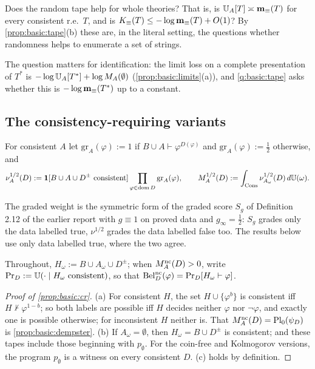 \begin{question}\label{q:basic:tape}
Does the random tape help for whole theories? That is, is $\mathbb{U}_{A}[T]\asymp\mathbf{m}_{\equiv}(T)$ for every consistent r.e.\ $T$, and is $K_{\equiv}(T)\le-\log\mathbf{m}_{\equiv}(T)+O(1)$? By \cref{prop:basic:tape}(b) these are, in the literal setting, the questions whether randomness helps to enumerate a set of strings.
\end{question}

The question matters for identification: the limit loss on a complete presentation of $T^*$ is $-\log\mathbb{U}_{A}[T^*]+\log M_{A}(\emptyset)$ (\cref{prop:basic:limits}(a)), and \cref{q:basic:tape} asks whether this is $-\log\mathbf{m}_{\equiv}(T^*)$ up to a constant.

\subsection{The consistency-requiring variants}\label{app:basic:cr}

\begin{definition}\label{def:setting:graded}
For consistent $A$ let $\mathrm{gr}_A(\varphi):=1$ if $B\cup A\vdash\varphi^{D(\varphi)}$ and $\mathrm{gr}_A(\varphi):=\frac12$ otherwise, and
\[
\nu^{1/2}_A(D):=\mathbf{1}[B\cup A\cup D^\pm\text{ consistent}]\prod_{\varphi\in\operatorname{dom} D}\mathrm{gr}_A(\varphi),\qquad M_{A}^{1/2}(D):=\int_{\mathrm{Cons}}\nu^{1/2}_{A_\omega}(D)\,d\mathbb{U}(\omega).
\]
\end{definition}

The graded weight is the symmetric form of the graded score $S_g$ of Definition 2.12 of the earlier report with $g\equiv1$ on proved data and $g_\infty=\frac12$: $S_g$ grades only the data labelled true, $\nu^{1/2}$ grades the data labelled false too. The results below use only data labelled true, where the two agree.

Throughout, $H_\omega:=B\cup A_\omega\cup D^\pm$; when $M_{A}^{\mathrm{nc}}(D)>0$, write $\Pr_D:=\mathbb{U}(\cdot\mid H_\omega\text{ consistent})$, so that $\mathrm{Bel}^{\mathrm{nc}}_D(\varphi)=\Pr_D[H_\omega\vdash\varphi]$.

\begin{proof}[Proof of \cref{prop:basic:cr}]
(a) For consistent $H$, the set $H\cup\{\varphi^b\}$ is consistent iff $H\nvdash\varphi^{1-b}$; so both labels are possible iff $H$ decides neither $\varphi$ nor $\neg\varphi$, and exactly one is possible otherwise; for inconsistent $H$ neither is. That $M_{A}^{\mathrm{nc}}(D)=\mathrm{Pl}_0(\psi_D)$ is \cref{prop:basic:dempster}. (b) If $A_\omega=\emptyset$, then $H_\omega=B\cup D^\pm$ is consistent; and these tapes include those beginning with $p_\emptyset$. For the coin-free and Kolmogorov versions, the program $p_\emptyset$ is a witness on every consistent $D$. (c) holds by definition.
\end{proof}

